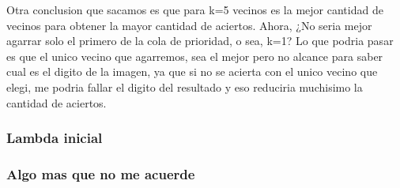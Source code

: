 Otra conclusion que sacamos es que para k=5 vecinos es la mejor cantidad de vecinos para obtener la mayor cantidad de aciertos. 
Ahora, ¿No seria mejor agarrar solo el primero de la cola de prioridad, o sea, k=1? 
Lo que podria pasar es que el unico vecino que agarremos, sea el mejor pero no alcance para saber cual es el digito de la imagen, ya que si no se acierta con el unico vecino que elegi, me podria fallar el digito del resultado y eso reduciria muchisimo la cantidad de aciertos.

\subsubsection{Lambda inicial}

\subsubsection{Algo mas que no me acuerde}
